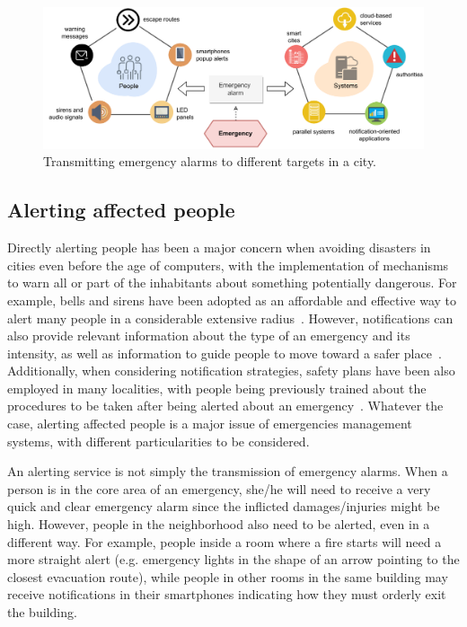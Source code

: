 \begin{refsection}
\begin{figure}[htbp]
  \centering
  \includegraphics[scale=0.75]{Chapters/1-Survey/images/notifications.pdf}
  \caption{Transmitting emergency alarms to different targets in a city.}\label{Fig:notifications}
\end{figure}

\subsection{Alerting affected people}

Directly alerting people has been a major concern when avoiding disasters in cities even before the age of computers, with the implementation of mechanisms to warn all or part of the inhabitants about something potentially dangerous. For example, bells and sirens have been adopted as an affordable and effective way to alert many people in a considerable extensive radius~\cite{socialmedia5,citiesemergencies1}. However, notifications can also provide relevant information about the type of an emergency and its intensity, as well as information to guide people to move toward a safer place~\cite{emergenciesmetric2}. Additionally, when considering notification strategies, safety plans have been also employed in many localities, with people being previously trained about the procedures to be taken after being alerted about an emergency~\cite{quakeculture,citiesdisasters2}. Whatever the case, alerting affected people is a major issue of emergencies management systems, with different particularities to be considered. 

An alerting service is not simply the transmission of emergency alarms. When a person is in the core area of an emergency, she/he will need to receive a very quick and clear emergency alarm since the inflicted damages/injuries might be high. However, people in the neighborhood also need to be alerted, even in a different way. For example, people inside a room where a fire starts will need a more straight alert (e.g. emergency lights in the shape of an arrow pointing to the closest evacuation route), while people in other rooms in the same building may receive notifications in their smartphones indicating how they must orderly exit the building. 


\end{refsection}
